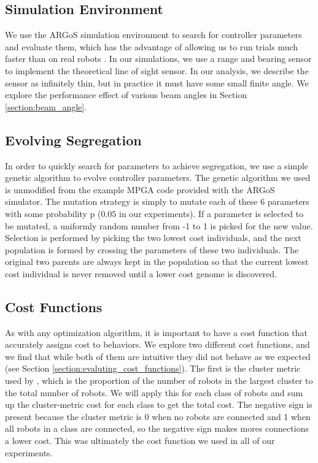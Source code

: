 \documentclass[conference]{IEEEtran}
\begin{document}
  \subsection{Simulation Environment}

    We use the ARGoS simulation environment to search for controller parameters and evaluate them, which has the advantage of allowing us to run trials much faster than on real robots \cite{pinciroli_argos:_2012}. In our simulations, we use a range and bearing sensor to implement the theoretical line of sight sensor. In our analysis, we describe the sensor as infinitely thin, but in practice it must have some small finite angle. We explore the performance effect of various beam angles in Section \ref{section:beam_angle}.

  \subsection{Evolving Segregation}

    In order to quickly search for parameters to achieve segregation, we use a simple genetic algorithm to evolve controller parameters. The genetic algorithm we used is unmodified from the example MPGA code provided with the ARGoS simulator. The mutation strategy is simply to mutate each of these 6 parameters with some probability p ($0.05$ in our experiments). If a parameter is selected to be mutated, a uniformly random number from -1 to 1 is picked for the new value. Selection is performed by picking the two lowest cost individuals, and the next population is formed by crossing the parameters of these two individuals. The original two parents are always kept in the population so that the current lowest cost individual is never removed until a lower cost genome is discovered.

  \subsection{Cost Functions}

    As with any optimization algorithm, it is important to have a cost function that accurately assigns cost to behaviors. We explore two different cost functions, and we find that while both of them are intuitive they did not behave as we expected (see Section \ref{section:evaluting_cost_functions}). The first is the cluster metric used by \cite{gauci_self-organized_2014}, which is the proportion of the number of robots in the largest cluster to the total number of robots. We will apply this for each class of robots and sum up the cluster-metric cost for each class to get the total cost. The negative sign is present because the cluster metric is 0 when no robots are connected and 1 when all robots in a class are connected, so the negative sign makes mores connections a lower cost. This was ultimately the cost function we used in all of our experiments.
\end{document}
